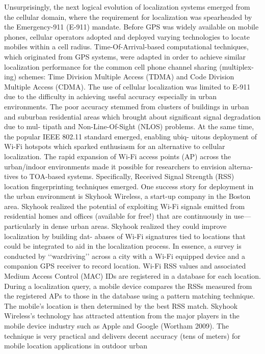 Unsurprisingly, the next logical evolution of localization systems emerged from
the cellular domain, where the requirement for localization was spearheaded by the
Emergency-911 (E-911) mandate. Before GPS was widely available on mobile
phones, cellular operators adopted and deployed varying technologies to locate
mobiles within a cell radius. Time-Of-Arrival-based computational techniques,
which originated from GPS systems, were adapted in order to achieve similar
localization performance for the common cell phone channel sharing (multiplex-
ing) schemes: Time Division Multiple Access (TDMA) and Code Division
Multiple Access (CDMA). The use of cellular localization was limited to E-911
due to the difficulty in achieving useful accuracy especially in urban environments.
The poor accuracy stemmed from clusters of buildings in urban and suburban
residential areas which brought about significant signal degradation due to mul-
tipath and Non-Line-Of-Sight (NLOS) problems.
At the same time, the popular IEEE 802.11 standard emerged, enabling ubiq-
uitous deployment of Wi-Fi hotspots which sparked enthusiasm for an alternative
to cellular localization. The rapid expansion of Wi-Fi access points (AP) across the
urban/indoor environments made it possible for researchers to envision alterna-
tives to TOA-based systems. Specifically, Received Signal Strength (RSS) location
fingerprinting techniques emerged. One success story for deployment in the urban
environment is Skyhook Wireless, a start-up company in the Boston area. Skyhook
realized the potential of exploiting Wi-Fi signals emitted from residential homes
and offices (available for free!) that are continuously in use—particularly in dense
urban areas. Skyhook realized they could improve localization by building dat-
abases of Wi-Fi signatures tied to locations that could be integrated to aid in the
localization process. In essence, a survey is conducted by ‘‘wardriving’’ across a
city with a Wi-Fi equipped device and a companion GPS receiver to record
location. Wi-Fi RSS values and associated Medium Access Control (MAC) IDs
are registered in a database for each location. During a localization query, a mobile
device compares the RSSs measured from the registered APs to those in the
database using a pattern matching technique. The mobile’s location is then
determined by the best RSS match. Skyhook Wireless’s technology has attracted
attention from the major players in the mobile device industry such as Apple and
Google (Wortham 2009). The technique is very practical and delivers decent
accuracy (tens of meters) for mobile location applications in outdoor urban
